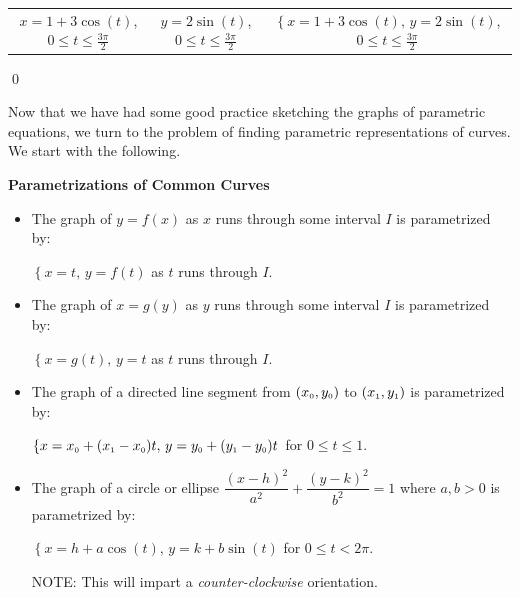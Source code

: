 \begin{ex}
\begin{enumerate}
\begin{tabular}{ccc}
{\scriptsize $x =1+3\cos(t)$, $0 \leq  t \leq \frac{3\pi}{2}$} & {\scriptsize $y = 2\sin(t)$, $0 \leq t \leq \frac{3\pi}{2}$} & {\scriptsize $\left\{ x = 1 + 3\cos(t), \,  y = 2\sin(t) \right.$, $0 \leq t \leq \frac{3\pi}{2}$}  \\

\end{tabular}

\enlargethispage{\baselineskip}

\qed

\end{enumerate}

\end{ex}

Now that we have had some good practice sketching the graphs of parametric equations, we turn to the problem of finding parametric representations of curves.  We start with the following.

\medskip

\colorbox{ResultColor}{\bbm

\label{commonparametrizations}


\centerline{\textbf{Parametrizations of Common Curves}}

\begin{itemize}

\item  The graph of  $y=f(x)$ as $x$ runs through some interval $I$ is parametrized by:

$\left\{ x = t, \, y = f(t) \right.$ as  $t$ runs through $I$.

\item  The graph of  $x=g(y)$ as $y$ runs through some interval $I$ is parametrized by:

$\left\{ x = g(t), \, y = t \right.$ as  $t$ runs through $I$.

\item  The graph of a  directed line segment from $(x_{\text{\tiny$0$}}, y_{\text{\tiny$0$}})$ to $(x_{\text{\tiny$1$}}, y_{\text{\tiny$1$}})$ is parametrized by:

$\left\{ x  = x_{\text{\tiny$0$}} + (x_{\text{\tiny$1$}} - x_{\text{\tiny$0$}}) t, \, y = y_{\text{\tiny$0$}} + (y_{\text{\tiny$1$}} - y_{\text{\tiny$0$}}) t \right.$  for $0 \leq t \leq 1$.



\item  The graph of a circle or ellipse $\dfrac{(x-h)^2}{a^2} + \dfrac{(y-k)^2}{b^2} = 1$ where $a,b > 0$ is parametrized by:

$\left\{ x =  h+a\cos(t), \, y = k+b\sin(t) \right.$  for $0 \leq t < 2\pi$. 

NOTE:  This will impart a \textit{counter-clockwise} orientation.

\end{itemize}

\smallskip

\ebm}

